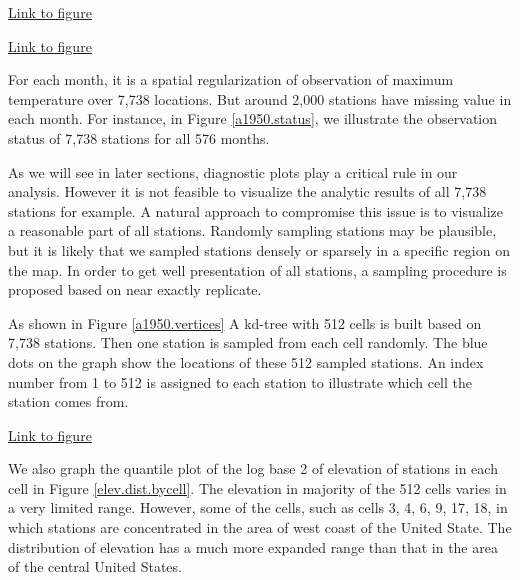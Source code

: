 \begin{framed}
\begin{center}
  \href{../plots/a1950stations.pdf}{Link to figure}
  \label{a1950.location}
\end{center}
\end{framed}

\begin{framed}
\begin{center}
  \href{../plots/tmax.a1950.status.pdf}
  {Link to figure}
  \label{a1950.status}
\end{center}
\end{framed}

For each month, it is a spatial regularization of observation of maximum 
temperature over 7,738 locations. But around 2,000 stations have 
missing value in each month. For instance, in Figure 
\href{../plots/tmax.a1950.status.pdf}{\ref*{a1950.status}},
we illustrate the observation status of 7,738 stations for all 576 months.

As we will see in later sections, diagnostic plots play a critical rule in our
analysis. However it is not feasible to visualize the analytic results of all
7,738 stations for example. A natural approach to compromise this issue is to 
visualize a reasonable part of all stations. Randomly sampling stations may be
plausible, but it is likely that we sampled stations densely or sparsely in a 
specific region on the map. In order to get well presentation of all stations,
a sampling procedure is proposed based on near exactly replicate.

As shown in Figure \href{../plots/vertices.a1950.pdf}{\ref*{a1950.vertices}}
A kd-tree with 512 cells is built based on 7,738 stations. Then one station is 
sampled from each cell randomly. The blue dots on the graph show the locations 
of these 512 sampled stations. An index number from 1 to 512 is assigned to each 
station to illustrate which cell the station comes from. 

\begin{framed}
\begin{center}
  \href{../plots/vertices.a1950.pdf}{Link to figure}
  \label{a1950.vertices}
\end{center}
\end{framed}

We also graph the quantile plot of the log base 2 of elevation of stations in each
cell in Figure \href{../plots/elev.dist.bycell.pdf}{\ref*{elev.dist.bycell}}. 
The elevation in majority of the 512 cells varies in a very limited range. However, 
some of the cells, such as cells 3, 4, 6, 9, 17, 18, in which stations are 
concentrated in the area of west coast of the United State. The distribution of 
elevation has a much more expanded range than that in the area of the central 
United States. 

